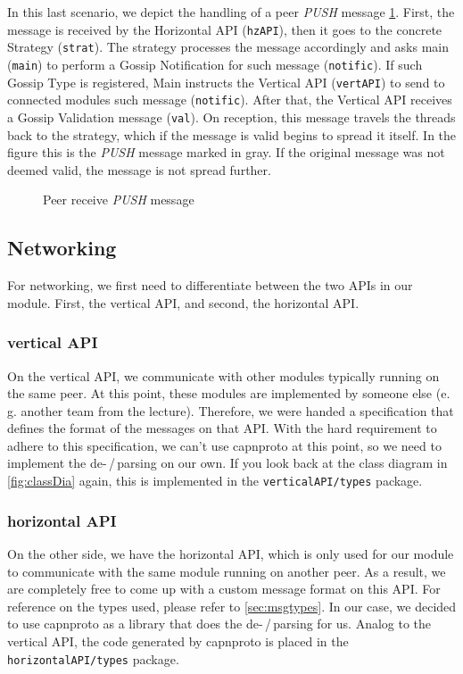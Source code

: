 \documentclass[a4paper,english,10pt,NET]{tumarticle}
\renewcommand{\eg}{\mbox{e.\,g.}\xspace} %
\begin{document}
In this last scenario, we depict the handling of a peer \textit{PUSH} message \cref{fig:msg-relay}. First, the message is received by the Horizontal API (\texttt{hzAPI}), then it goes to the concrete Strategy (\texttt{strat}). The strategy processes the message accordingly and asks main (\texttt{main}) to perform a Gossip Notification for such message (\texttt{notific}). If such Gossip Type is registered, Main instructs the Vertical API (\texttt{vertAPI}) to send to connected modules such message (\texttt{notific}). After that, the Vertical API receives a Gossip Validation message (\texttt{val}). On reception, this message travels the threads back to the strategy, which if the message is valid begins to spread it itself. In the figure this is the \textit{PUSH} message marked in gray. If the original message was not deemed valid, the message is not spread further.

\begin{figure}
	\centering
	
	\caption{Peer receive \textit{PUSH} message}
	\label{fig:msg-relay}
\end{figure}


\subsection{Networking} \label{sec:structureNetworking}
For networking, we first need to differentiate between the two APIs in our module.
First, the vertical API, and second, the horizontal API.

\subsubsection{vertical API}
On the vertical API, we communicate with other modules typically running on the same peer.
At this point, these modules are implemented by someone else (\eg another team from the lecture).
Therefore, we were handed a specification that defines the format of the messages on that API.
With the hard requirement to adhere to this specification, we can't use capnproto at this point, so we need to implement the de-\,/\,parsing on our own.
If you look back at the class diagram in \cref{fig:classDia} again, this is implemented in the \texttt{verticalAPI/types} package.

\subsubsection{horizontal API}
On the other side, we have the horizontal API, which is only used for our module to communicate with the same module running on another peer.
As a result, we are completely free to come up with a custom message format on this API.
For reference on the types used, please refer to \cref{sec:msgtypes}.
In our case, we decided to use capnproto as a library that does the de-\,/\,parsing for us.
Analog to the vertical API, the code generated by capnproto is placed in the \texttt{horizontalAPI/types} package.
\end{document}
